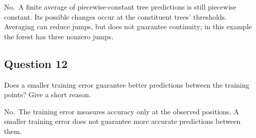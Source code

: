 \documentclass[10pt]{article}
\begin{document}
\begingroup\color{red}

No. A finite average of piecewise-constant tree predictions is still
piecewise constant. Its possible changes occur at the constituent
trees' thresholds. Averaging can reduce jumps, but does not
guarantee continuity; in this example the forest has three nonzero
jumps.

\par\endgroup

\subsection*{Question 12}
Does a smaller training error guarantee better predictions between the training points? Give a short reason.

\begingroup\color{red}

No. The training error measures accuracy only at the observed
positions. A smaller training error does not guarantee more accurate
predictions between them.

\par\endgroup
\end{document}
